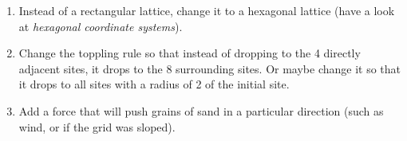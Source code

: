 \documentclass[
  a4paper,             %
  11pt,                %
  oneside,             %
  onecolumn,           %
  bibliography=totoc,  %
  final,               %
]{scrartcl}
\begin{document}
\begin{enumerate}
        Perhaps you don't want to increase the timestep every topple, but every
        \(n\)th topple.
  \item Instead of a rectangular lattice, change it to a hexagonal lattice (have a
        look at \emph{hexagonal coordinate systems}).
  \item Change the toppling rule so that instead of dropping to the 4 directly
        adjacent sites, it drops to the 8 surrounding sites.  Or maybe change it so
        that it drops to all sites with a radius of 2 of the initial site.
  \item Add a force that will push grains of sand in a particular direction
        (such as wind, or if the grid was sloped).
\end{enumerate}

\cleardoublepage
\printbibliography
\end{document}
